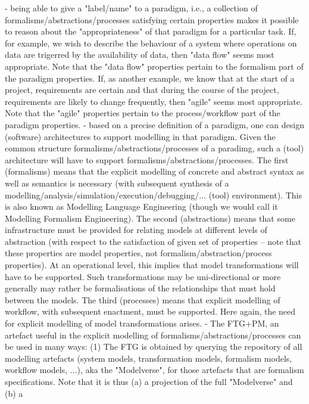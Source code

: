 - being able to give a "label/name" to a paradigm, i.e., a collection of 
formalisms/abstractions/processes
  satisfying certain properties makes it possible to reason about the 
"appropriateness" of
  that paradigm for a particular task.
  If, for example, we wish to describe the behaviour of a system where 
operations on data are
  trigerred by the availability of data, then "data flow" seems most 
appropriate.
  Note that the "data flow" properties pertain to the formalism part of the 
paradigm properties.
  If, as another example, we know that at the start of a project, requirements 
are certain and
  that during the course of the project, requirements are likely to change 
frequently,
  then "agile" seems most appropriate.
  Note that the "agile" properties pertain to the process/workflow part of the 
paradigm properties.
- based on a precise definition of a paradigm, one can design (software) 
architectures
  to support modelling in that paradigm. Given the common structure 
formalisms/abstractions/processes
  of a paradimg, such a (tool) architecture will have to support 
formalisms/abstractions/processes.
  The first (formalisms) means that the explicit modelling of concrete and 
abstract syntax as
  well as semantics is necessary (with subsequent synthesis of a 
modelling/analysis/simulation/execution/debugging/...  (tool) environment).
  This is also known as Modelling Language Engineering (though we would call it 
Modelling Formalism Engineering).
  The second (abstractions) means that some infrastructure must be provided for 
relating models at different
  levels of abstraction (with respect to the satisfaction of given set of 
properties -- note that these properties
  are model properties, not formalism/abstraction/process properties). At an 
operational level, this
  implies that model transformations will have to be supported. Such 
transformations may be uni-directional or
  more generally may rather be formalisations of the relationships that must 
hold between the models.
  The third (processes) means that explicit modelling of workflow, with 
subsequent enactment, must be supported.
  Here again, the need for explicit modelling of model transformations arises.
- The FTG+PM, an artefact useful in the explicit modelling of 
formalisms/abstractions/processes can be used in many ways:
  (1) The FTG is obtained by querying the repository of all modelling artefacts 
(system models, transformation models,
      formalism models, workflow models, ...), aka the "Modelverse", for those 
artefacts that are formalism specifications.
      Note that it is thus (a) a projection of the full "Modelverse" and (b) a 
